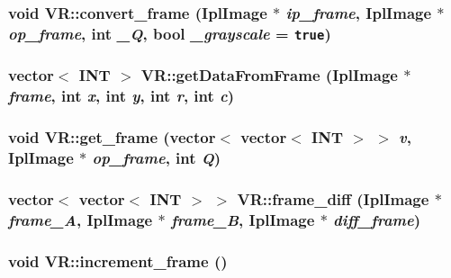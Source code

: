 \subsubsection{\setlength{\rightskip}{0pt plus 5cm}void VR::convert\_\-frame (IplImage $\ast$ {\em ip\_\-frame}, IplImage $\ast$ {\em op\_\-frame}, int {\em \_\-Q}, bool {\em \_\-grayscale} = {\tt true})}\label{structVR_de9036961ef32e6d09204af5698ea234}


\subsubsection{\setlength{\rightskip}{0pt plus 5cm}vector$<$ {\bf INT} $>$ VR::getDataFromFrame (IplImage $\ast$ {\em frame}, int {\em x}, int {\em y}, int {\em r}, int {\em c})}\label{structVR_7d2985f314791bfb591d5f049c56bc4d}


\subsubsection{\setlength{\rightskip}{0pt plus 5cm}void VR::get\_\-frame (vector$<$ vector$<$ {\bf INT} $>$ $>$ {\em v}, IplImage $\ast$ {\em op\_\-frame}, int {\em Q})}\label{structVR_3dee2ea3531054757a5f71c12caf31a1}


\subsubsection{\setlength{\rightskip}{0pt plus 5cm}vector$<$ vector$<$ {\bf INT} $>$ $>$ VR::frame\_\-diff (IplImage $\ast$ {\em frame\_\-A}, IplImage $\ast$ {\em frame\_\-B}, IplImage $\ast$ {\em diff\_\-frame})}\label{structVR_52dc726c38303716bb893fe5f8dd1af5}


\subsubsection{\setlength{\rightskip}{0pt plus 5cm}void VR::increment\_\-frame ()}\label{structVR_331d9c73bc85576a385f6c448f4b08f6}


